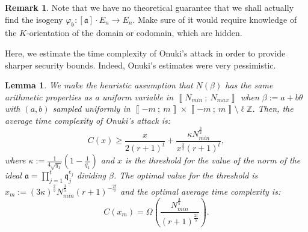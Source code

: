 \documentclass[a4paper,10pt]{report}
\theoremstyle{definition}
\theoremstyle{plain}
\newtheorem{Lemma}[Definition]{Lemma}
\theoremstyle{definition}
\newtheorem{Remark}[Definition]{Remark}
\newcommand{\Z}{\mathbb{Z}}
\renewcommand{\i}[2]{\left\llbracket #1~;~#2\right\rrbracket}
\renewcommand{\(}{\left(}
\renewcommand{\)}{\right)}
\newcommand{\mf}[1]{\mathfrak{#1}}
\begin{document}
\begin{Remark}
Note that we have no theoretical guarantee that we shall actually find the isogeny $\varphi_{\mf{b}}:[\mf{a}]\cdot E_n\longrightarrow E_n$. Make sure of it would require knowledge of the $K$-orientation of the domain or codomain, which are hidden.
\end{Remark} 

Here, we estimate the time complexity of Onuki's attack in order to provide sharper security bounds. Indeed, Onuki's estimates were very pessimistic.

\begin{Lemma}
We make the heuristic assumption that $N(\beta)$ has the same arithmetic properties as a uniform variable in $\i{N_{min}}{N_{max}}$ when $\beta:=a+b\theta$ with $(a,b)$ sampled uniformly in $\i{-m}{m}\times\i{-m}{m}\setminus\ell\Z$. Then, the average time complexity of Onuki's attack \cite[§ 6.3]{Onuki} is:
\[C(x)\geq \frac{x}{2(r+1)^t}+\frac{\kappa N_{min}^{\frac{3}{2}}}{x^{\frac{3}{2}}(r+1)^t},\]
where $\kappa:=\frac{1}{4\sqrt{q_1}}\(1-\frac{1}{q_1}\)$ and $x$ is the threshold for the value of the norm of the ideal $\mf{a}=\prod_{j=1}^t\mf{q}_j^{e_j}$ dividing $\beta$. The optimal value for the threshold is $x_m:=(3\kappa)^{\frac{2}{5}}N_{min}^{\frac{3}{5}}(r+1)^{-\frac{2t}{5}}$ and the optimal average time complexity is: 
\[C(x_m)=\Omega\(\frac{N_{min}^{\frac{3}{5}}}{(r+1)^{\frac{2t}{5}}}\).\]
\end{Lemma}
\end{document}
